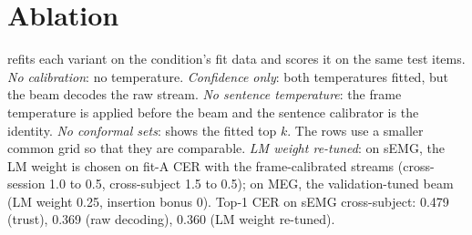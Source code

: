 \FloatBarrier
\section{Ablation}
\label{app:ablation}

 refits each variant on the condition's fit data and scores it on the same test items. \emph{No calibration}: no temperature. \emph{Confidence only}: both temperatures fitted, but the beam decodes the raw stream. \emph{No sentence temperature}: the frame temperature is applied before the beam and the sentence calibrator is the identity. \emph{No conformal sets}:  shows the fitted top $k$. The  rows use a smaller common grid so that they are comparable. \emph{LM weight re-tuned}: on sEMG, the LM weight is chosen on fit-A CER with the frame-calibrated streams (cross-session 1.0 to 0.5, cross-subject 1.5 to 0.5); on MEG, the validation-tuned beam (LM weight 0.25, insertion bonus 0). Top-1 CER on sEMG cross-subject: 0.479 (trust), 0.369 (raw decoding), 0.360 (LM weight re-tuned).

